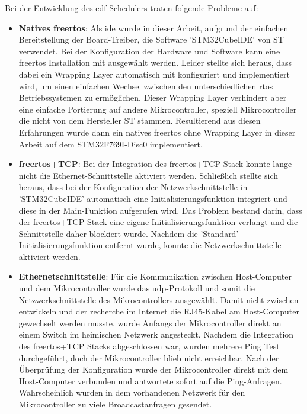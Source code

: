 \documentclass[../EDF Master Thesis.tex]{subfiles}
\begin{document}
    Bei der Entwicklung des \ac{edf}-Schedulers traten folgende Probleme auf:
    \begin{itemize}
        \item \textbf{Natives \ac{freertos}}: Als \ac{ide} wurde in dieser Arbeit, aufgrund der einfachen Bereitstellung der Board-Treiber, die Software 'STM32CubeIDE' von ST verwendet.
            Bei der Konfiguration der Hardware und Software kann eine \ac{freertos} Installation mit ausgewählt werden.
            Leider stellte sich heraus, dass dabei ein Wrapping Layer automatisch mit konfiguriert und implementiert wird, um einen einfachen Wechsel zwischen den unterschiedlichen \ac{rtos} Betriebssystemen zu ermöglichen.
            Dieser Wrapping Layer verhindert aber eine einfache Portierung auf andere Mikrocontroller, speziell Mikrocontroller die nicht von dem Hersteller ST stammen.
            Resultierend aus diesen Erfahrungen wurde dann ein natives \ac{freertos} ohne Wrapping Layer in dieser Arbeit auf dem STM32F769I-Disc0 implementiert.
        \item \textbf{\ac{freertos}+TCP}: Bei der Integration des \ac{freertos}+TCP Stack konnte lange nicht die Ethernet-Schnittstelle aktiviert werden.
            Schließlich stellte sich heraus, dass bei der Konfiguration der Netzwerkschnittstelle in 'STM32CubeIDE' automatisch eine Initialisierungsfunktion integriert und diese in der Main-Funktion aufgerufen wird.
            Das Problem bestand darin, dass der \ac{freertos}+TCP Stack eine eigene Initialisierungsfunktion verlangt und die Schnittstelle daher blockiert wurde.
            Nachdem die 'Standard'-Initialisierungsfunktion entfernt wurde, konnte die Netzwerkschnittstelle aktiviert werden.
        \item \textbf{Ethernetschnittstelle}: Für die Kommunikation zwischen Host-Computer und dem Mikrocontroller wurde das \ac{udp}-Protokoll und somit die Netzwerkschnittstelle des Mikrocontrollers ausgewählt.
            Damit nicht zwischen entwickeln und der recherche im Internet die RJ45-Kabel am Host-Computer gewechselt werden musste, wurde Anfangs der Mikrocontroller direkt an einem Switch im heimischen Netzwerk angesteckt.
            Nachdem die Integration des \ac{freertos}+TCP Stacks abgeschlossen war, wurden mehrere Ping Test durchgeführt, doch der Mikrocontroller blieb nicht erreichbar.
            Nach der Überprüfung der Konfiguration wurde der Mikrocontroller direkt mit dem Host-Computer verbunden und antwortete sofort auf die Ping-Anfragen.
            Wahrscheinlich wurden in dem vorhandenen Netzwerk für den Mikrocontroller zu viele Broadcastanfragen gesendet.

\end{itemize}
\end{document}
